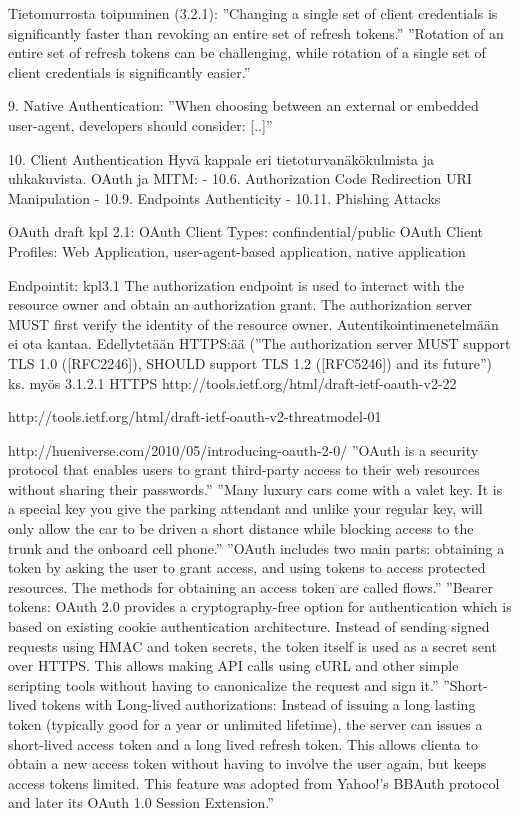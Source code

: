 \documentclass[finnish,gradu]{tktltiki}
\begin{document}
  Tietomurrosta toipuminen (3.2.1):
  ''Changing a single set of client credentials is significantly faster than revoking an entire set of refresh tokens.''
  ''Rotation of an entire set of refresh tokens can be challenging, while rotation of a single set of client credentials is significantly easier.''

  9. Native Authentication:
  ''When choosing between an external or embedded user-agent, developers should consider: [..]''

  10. Client Authentication
  Hyvä kappale eri tietoturvanäkökulmista ja uhkakuvista.
  OAuth ja MITM:
  - 10.6.  Authorization Code Redirection URI Manipulation
  - 10.9.  Endpoints Authenticity
  - 10.11.  Phishing Attacks


  OAuth draft kpl 2.1:
  OAuth Client Types: confindential/public
  OAuth Client Profiles: Web Application, user-agent-based application, native application

  Endpointit: kpl3.1
   The authorization endpoint is used to interact with the resource
      owner and obtain an authorization grant.  The authorization server
      MUST first verify the identity of the resource owner.
   Autentikointimenetelmään ei ota kantaa.
   Edellytetään HTTPS:ää (''The authorization server MUST support TLS 1.0 ([RFC2246]), SHOULD support TLS 1.2 ([RFC5246]) and its future'')
   ks. myös 3.1.2.1 HTTPS
  http://tools.ietf.org/html/draft-ietf-oauth-v2-22

  http://tools.ietf.org/html/draft-ietf-oauth-v2-threatmodel-01

  http://hueniverse.com/2010/05/introducing-oauth-2-0/
  ''OAuth is a security protocol that enables users to grant third-party access to their web resources without sharing their passwords.''
  ''Many luxury cars come with a valet key. It is a special key you give the parking attendant and unlike your regular key, will only allow the car to be driven a short distance while blocking access to the trunk and the onboard cell phone.''
  ''OAuth includes two main parts: obtaining a token by asking the user to grant access, and using tokens to access protected resources. The methods for obtaining an access token are called flows.''
  ''Bearer tokens: OAuth 2.0 provides a cryptography-free option for authentication which is based on existing cookie authentication architecture. Instead of sending signed requests using HMAC and token secrets, the token itself is used as a secret sent over HTTPS. This allows making API calls using cURL and other simple scripting tools without having to canonicalize the request and sign it.''
  ''Short-lived tokens with Long-lived authorizations: Instead of issuing a long lasting token (typically good for a year or unlimited lifetime), the server can issues a short-lived access token and a long lived refresh token. This allows clienta to obtain a new access token without having to involve the user again, but keeps access tokens limited. This feature was adopted from Yahoo!’s BBAuth protocol and later its OAuth 1.0 Session Extension.''
\end{document}
